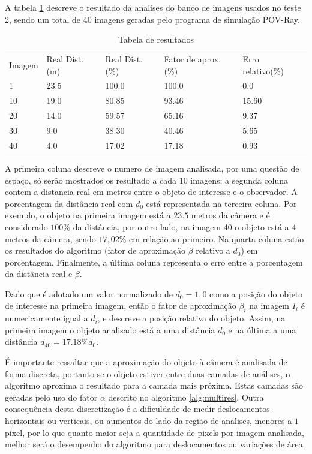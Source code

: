 A tabela \ref{tab:tab1} descreve o resultado da analises do banco 
de imagens usados no teste 2, sendo um total de 40 imagens geradas
pelo programa de simulação POV-Ray.
\begin{table}[H]
\setlength{\tabcolsep}{1 pt} 
\caption{Tabela de resultados}
\begin{tabular}{lllll}
Imagem & Real Dist.(m) & Real Dist.(\%) & Fator de aprox.(\%) & Erro relativo(\%)\\
1 & 23.5 & 100.0 & 100.0 & 0.0 \\
10 & 19.0 & 80.85 & 93.46 & 15.60 \\
20 & 14.0 & 59.57 & 65.16 & 9.37 \\
30 & 9.0 & 38.30 & 40.46 & 5.65 \\
40 & 4.0 & 17.02 & 17.18 & 0.93
\end{tabular}
\label{tab:tab1}
\end{table}
A primeira coluna descreve o numero de imagem analisada, por uma questão de espaço, só serão mostrados
os resultado a cada 10 imagens; a segunda coluna contem a distancia 
real em metros entre o objeto de interesse e o observador.
A porcentagem da distância real com $d_0$ está representada na terceira coluna. Por exemplo, o objeto na primeira imagem
está a $23.5$ metros da câmera e é considerado $100$\% da distância, por outro lado, na imagem 40 o objeto está a
$4$ metros da câmera, sendo $17,02$\% em relação ao primeiro. Na quarta coluna estão os resultados do algoritmo (fator
de aproximação $\beta$ relativo a $d_0$) em porcentagem. Finalmente, a última coluna representa o erro 
entre a porcentagem da distância real e $\beta$.

Dado que é adotado um valor normalizado de $d_0=1,0$ como a posição do objeto de interesse na primeira 
imagem, então o fator de aproximação $\beta_i$ na imagem $I_i$ é 
numericamente igual a $d_i$, e descreve a posição relativa do objeto.
Assim, na primeira imagem o objeto analisado está a uma distância $d_0$
e na última a uma distância $d_{40}=17.18\%d_0$.

É importante ressaltar que a aproximação do objeto à câmera é analisada de forma discreta, 
portanto se o objeto
estiver entre duas camadas de análises, o algoritmo aproxima o resultado para
a camada mais próxima. Estas camadas são geradas pelo uso do fator $\alpha$
descrito no algoritmo \ref{alg:multires}. Outra consequência desta discretização
é a dificuldade de medir deslocamentos horizontais ou verticais, ou aumentos do lado da região de analises,
menores a $1$ pixel, por lo que quanto maior seja a quantidade de pixels por
imagem analisada, melhor será o desempenho do algoritmo para deslocamentos ou variações de área.

